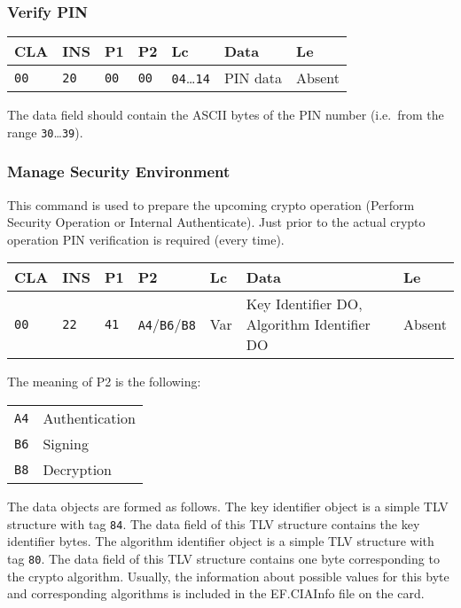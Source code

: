 \documentclass{article}
\begin{document}
\subsubsection{Verify PIN}

\begin{flushleft}
\begin{tabular}{|l|l|l|l|l|l|l|}
\hline
CLA & INS & P1 & P2 & Lc & Data & Le \\
\hline
\texttt{00} & \texttt{20} & \texttt{00} & \texttt{00} &
\texttt{04}\dots\texttt{14} & PIN data & Absent \\
\hline
\end{tabular}
\end{flushleft}
The data field should contain the ASCII bytes of the PIN number
(i.e.\ from the range \texttt{30}\dots\texttt{39}).

\subsubsection{Manage Security Environment}

This command is used to prepare the upcoming crypto operation (Perform
Security Operation or Internal Authenticate). Just prior to the actual
crypto operation PIN verification is required (every time).
\begin{flushleft}
\begin{tabular}{|l|l|l|l|l|l|l|}
\hline
CLA & INS & P1 & P2 & Lc & Data & Le \\
\hline
\texttt{00} & \texttt{22} & \texttt{41} & \texttt{A4}/\texttt{B6}/\texttt{B8} &
Var & Key Identifier DO, Algorithm Identifier DO & Absent \\
\hline
\end{tabular}
\end{flushleft}
The meaning of P2 is the following:
\begin{flushleft}
\begin{tabular}{|l|l|}
\hline
\texttt{A4} & Authentication \\
\texttt{B6} & Signing \\
\texttt{B8} & Decryption \\
\hline
\end{tabular}
\end{flushleft}
The data objects are formed as follows. The key identifier object is a
simple TLV structure with tag \texttt{84}. The data field of this TLV
structure contains the key identifier bytes.  The algorithm identifier
object is a simple TLV structure with tag \texttt{80}. The data field
of this TLV structure contains one byte corresponding to the crypto
algorithm. Usually, the information about possible values for this
byte and corresponding algorithms is included in the EF.CIAInfo file
on the card.
\end{document}
